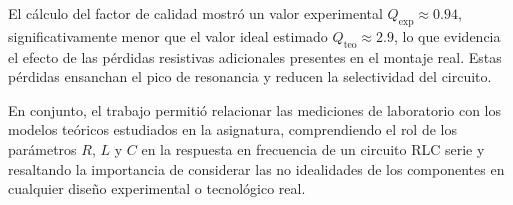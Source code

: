 \documentclass[a4paper,12pt]{article}
\begin{document}
El cálculo del factor de calidad mostró un valor experimental \( Q_{\text{exp}} \approx 0.94 \), significativamente menor que el valor ideal estimado \( Q_{\text{teo}} \approx 2.9 \), lo que evidencia el efecto de las pérdidas resistivas adicionales presentes en el montaje real. Estas pérdidas ensanchan el pico de resonancia y reducen la selectividad del circuito.

En conjunto, el trabajo permitió relacionar las mediciones de laboratorio con los modelos teóricos estudiados en la asignatura, comprendiendo el rol de los parámetros \( R \), \( L \) y \( C \) en la respuesta en frecuencia de un circuito RLC serie y resaltando la importancia de considerar las no idealidades de los componentes en cualquier diseño experimental o tecnológico real.
\end{document}
